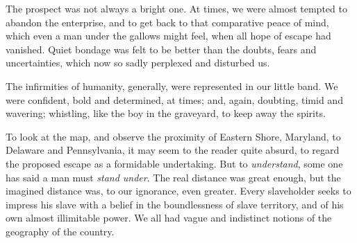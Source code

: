 The prospect was not always a bright one. At times, we were almost
tempted to abandon the enterprise, and to get back to that comparative
peace of {}mind, which even a man under the gallows might feel, when all
hope of escape had vanished. Quiet bondage was felt to be better than
the doubts, fears and uncertainties, which now so sadly perplexed and
disturbed us.

The infirmities of humanity, generally, were represented in our little
band. We were confident, bold and determined, at times; and, again,
doubting, timid and wavering; whistling, like the boy in the graveyard,
to keep away the spirits.

To look at the map, and observe the proximity of Eastern Shore,
Maryland, to Delaware and Pennsylvania, it may seem to the reader quite
absurd, to regard the proposed escape as a formidable undertaking. But
to \emph{understand}, some one has said a man must \emph{stand under}.
The real distance was great enough, but the imagined distance was, to
our ignorance, even greater. Every slaveholder seeks to impress his
slave with a belief in the boundlessness of slave territory, and of his
own almost illimitable power. We all had vague and indistinct notions of
the geography of the country.

